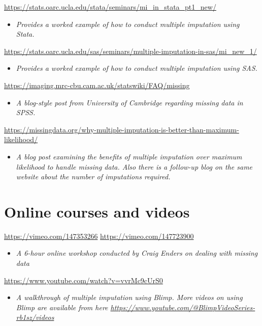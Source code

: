 \documentclass[
]{book}
\providecommand{\tightlist}{%
  \setlength{\itemsep}{0pt}\setlength{\parskip}{0pt}}
\begin{document}
\url{https://stats.oarc.ucla.edu/stata/seminars/mi_in_stata_pt1_new/}

\begin{itemize}
\tightlist
\item
  \emph{Provides a worked example of how to conduct multiple imputation using Stata. }
\end{itemize}

\url{https://stats.oarc.ucla.edu/sas/seminars/multiple-imputation-in-sas/mi_new_1/}

\begin{itemize}
\tightlist
\item
  \emph{Provides a worked example of how to conduct multiple imputation using SAS.}
\end{itemize}

\url{https://imaging.mrc-cbu.cam.ac.uk/statswiki/FAQ/missing}

\begin{itemize}
\tightlist
\item
  \emph{A blog-style post from University of Cambridge regarding missing data in SPSS.}
\end{itemize}

\url{https://missingdata.org/why-multiple-imputation-is-better-than-maximum-likelihood/}

\begin{itemize}
\tightlist
\item
  \emph{A blog post examining the benefits of multiple imputation over maximum likelihood to handle missing data. Also there is a follow-up blog on the same website about the number of imputations required. }
\end{itemize}

\section{Online courses and videos}\label{online-courses-and-videos-4}

\url{https://vimeo.com/147353266}
\url{https://vimeo.com/147723900}

\begin{itemize}
\tightlist
\item
  \emph{A 6-hour online workshop conducted by Craig Enders on dealing with missing data}
\end{itemize}

\url{https://www.youtube.com/watch?v=vvrMc9cUrS0}

\begin{itemize}
\tightlist
\item
  \emph{A walkthrough of multiple imputation using Blimp. More videos on using Blimp are available from here \url{https://www.youtube.com/@BlimpVideoSeries-rb1sz/videos} }
\end{itemize}
\end{document}
